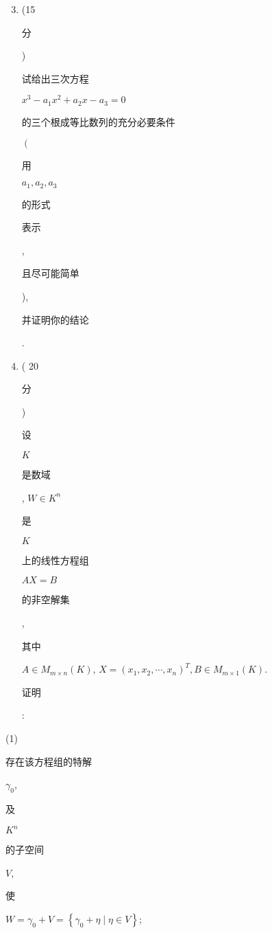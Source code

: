 \documentclass[10pt]{article}
\begin{document}
\begin{enumerate}
  \setcounter{enumi}{2}
  \item (15 \begin{CJK}{UTF8}{mj}分\end{CJK}) \begin{CJK}{UTF8}{mj}试给出三次方程\end{CJK} $x^{3}-a_{1} x^{2}+a_{2} x-a_{3}=0$ \begin{CJK}{UTF8}{mj}的三个根成等比数列的充分必要条件\end{CJK} $\left(\right.$ \begin{CJK}{UTF8}{mj}用\end{CJK} $a_{1}, a_{2}, a_{3}$ \begin{CJK}{UTF8}{mj}的形式\end{CJK} \begin{CJK}{UTF8}{mj}表示\end{CJK}, \begin{CJK}{UTF8}{mj}且尽可能简单\end{CJK}), \begin{CJK}{UTF8}{mj}并证明你的结论\end{CJK}.

  \item ( 20 \begin{CJK}{UTF8}{mj}分\end{CJK}) \begin{CJK}{UTF8}{mj}设\end{CJK} $K$ \begin{CJK}{UTF8}{mj}是数域\end{CJK}, $W \in K^{n}$ \begin{CJK}{UTF8}{mj}是\end{CJK} $K$ \begin{CJK}{UTF8}{mj}上的线性方程组\end{CJK} $A X=B$ \begin{CJK}{UTF8}{mj}的非空解集\end{CJK}, \begin{CJK}{UTF8}{mj}其中\end{CJK} $A \in M_{m \times n}(K)$, $X=\left(x_{1}, x_{2}, \cdots, x_{n}\right)^{T}, B \in M_{m \times 1}(K)$. \begin{CJK}{UTF8}{mj}证明\end{CJK}:

\end{enumerate}
(1) \begin{CJK}{UTF8}{mj}存在该方程组的特解\end{CJK} $\gamma_{0}$, \begin{CJK}{UTF8}{mj}及\end{CJK} $K^{n}$ \begin{CJK}{UTF8}{mj}的子空间\end{CJK} $V$, \begin{CJK}{UTF8}{mj}使\end{CJK} $W=\gamma_{0}+V=\left\{\gamma_{0}+\eta \mid \eta \in V\right\}$;
\end{document}
